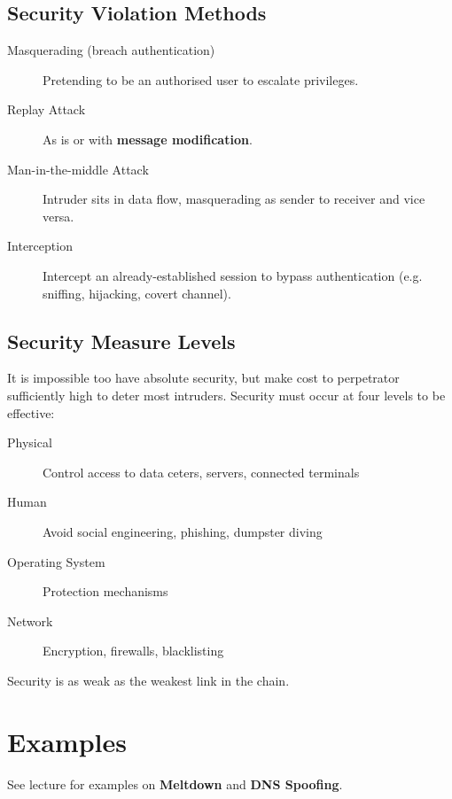 \documentclass[11pt]{article}
\begin{document}
\subsection{Security Violation Methods}
\label{sec:orgfcdb3ac}
\begin{description}
\item[{Masquerading (breach authentication)}] Pretending to be an authorised user to escalate privileges.
\item[{Replay Attack}] As is or with \textbf{message modification}.
\item[{Man-in-the-middle Attack}] Intruder sits in data flow, masquerading as sender to receiver and vice versa.
\item[{Interception}] Intercept an already-established session to bypass authentication (e.g. sniffing, hijacking, covert channel).
\end{description}

\subsection{Security Measure Levels}
\label{sec:org4542934}
It is impossible too have absolute security, but make cost to perpetrator sufficiently high to deter most intruders.
Security must occur at four levels to be effective:
\begin{description}
\item[{Physical}] Control access to data ceters, servers, connected terminals
\item[{Human}] Avoid social engineering, phishing, dumpster diving
\item[{Operating System}] Protection mechanisms
\item[{Network}] Encryption, firewalls, blacklisting
\end{description}
Security is as weak as the weakest link in the chain.

\section{Examples}
\label{sec:orgd3bb893}
See lecture for examples on \textbf{Meltdown} and \textbf{DNS Spoofing}.
\end{document}

